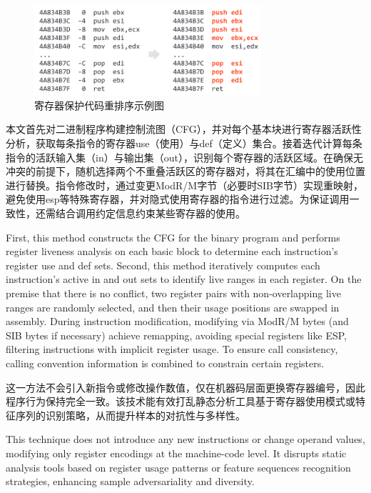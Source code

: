 \begin{figure}[hbt]
	\centering
	\includegraphics[width=0.75\textwidth]{figures/4.5}
	\caption{寄存器保护代码重排序示例图}\label{fig:4.5}
\end{figure}

本文首先对二进制程序构建控制流图（CFG），并对每个基本块进行寄存器活跃性分析，获取每条指令的寄存器use（使用）与def（定义）集合。接着迭代计算每条指令的活跃输入集（in）与输出集（out），识别每个寄存器的活跃区域。在确保无冲突的前提下，随机选择两个不重叠活跃区的寄存器对，将其在汇编中的使用位置进行替换。指令修改时，通过变更ModR/M字节（必要时SIB字节）实现重映射，避免使用esp等特殊寄存器，并对隐式使用寄存器的指令进行过滤。为保证调用一致性，还需结合调用约定信息约束某些寄存器的使用。

First, this method constructs the CFG for the binary program and performs register liveness analysis on each basic block to determine each instruction's register use and def sets. Second, this method iteratively computes each instruction's active in and out sets to identify live ranges in each register. On the premise that there is no conflict, two register pairs with non-overlapping live ranges are randomly selected, and then their usage positions are swapped in assembly. During instruction modification, modifying via ModR/M bytes (and SIB bytes if necessary) achieve remapping, avoiding special registers like ESP, filtering instructions with implicit register usage. To ensure call consistency, calling convention information is combined to constrain certain registers.

这一方法不会引入新指令或修改操作数值，仅在机器码层面更换寄存器编号，因此程序行为保持完全一致。该技术能有效打乱静态分析工具基于寄存器使用模式或特征序列的识别策略，从而提升样本的对抗性与多样性。

This technique does not introduce any new instructions or change operand values, modifying only register encodings at the machine-code level. It disrupts static analysis tools based on register usage patterns or feature sequences recognition strategies, enhancing sample adversariality and diversity.

